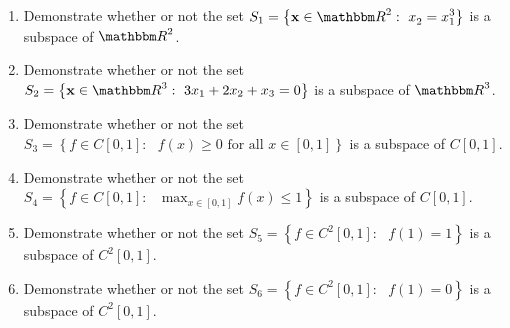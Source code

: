 
\begin{enumerate}
\item Demonstrate whether or not the set $\displaystyle{S_1=\left\{\Bx \in \R^2 :\mbox{ }x_2^{} = x_1^3\right\}}$ is a subspace of $\R^2$.
\\
\item Demonstrate whether or not the set $\displaystyle{S_2=\left\{\Bx \in \R^3 :\mbox{ }3x_1 + 2x_2 + x_3 = 0\right\}}$ is a subspace of $\R^3$.
\\
\item Demonstrate whether or not the set $\displaystyle{S_3=\left\{f \in C[0,1]:\mbox{ }f(x) \ge 0\mbox{ for all }x\in [0,1]\right\}}$ is a subspace of $C[0,1]$.
\\
\item Demonstrate whether or not the set $\displaystyle{S_4=\left\{f \in C[0,1]:\mbox{ }\max_{x\in[0,1]} f(x) \le 1\right\}}$ is a subspace of $C[0,1]$.
\\
\item Demonstrate whether or not the set $\displaystyle{S_5=\left\{f \in C^2[0,1]:\mbox{ }f(1) = 1\right\}}$ is a subspace of $C^2[0,1]$.
\\
\item Demonstrate whether or not the set $\displaystyle{S_6=\left\{f \in C^2[0,1]:\mbox{ }f(1) = 0\right\}}$ is a subspace of $C^2[0,1]$.
\end{enumerate}





